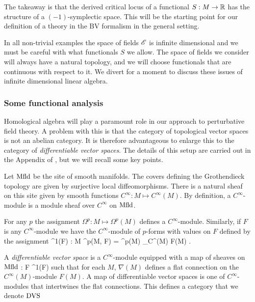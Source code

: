 The takeaway is that the derived critical locus of a functional $S : M \to \mathbb R$ has the structure of a $(-1)$-symplectic space.
This will be the starting point for our definition of a theory in the BV formalism in the general setting.
 
In all non-trivial examples the space of fields $\mathscr E$ is infinite dimensional and we must be careful with what functionals $S$ we allow.
The space of fields we consider will always have a natural topology, and we will choose functionals that are continuous with respect to it. 
We divert for a moment to discuss these issues of infinite dimensional linear algebra.

\subsubsection{Some functional analysis}
Homological algebra will play a paramount role in our approach to perturbative field theory.
A problem with this is that the category of topological vector spaces is not an abelian category.
It is therefore advantageous to enlarge this to the category of {\em differentiable vector spaces}.
The details of this setup are carried out in the Appendix of \cite{CG1}, but we will recall some key points.

Let ${\rm Mfld}$ be the site of smooth manifolds.
The covers defining the Grothendieck topology are given by surjective local diffeomorphisms.
There is a natural sheaf on this site given by smooth functions $C^\infty : M \mapsto C^\infty(M)$. 
By definition, a $C^\infty$-module is a module sheaf over $C^\infty$ on ${\rm Mfld}$. 

For any $p$ the assignment $\Omega^p : M \mapsto \Omega^p (M)$ defines a $C^\infty$-module.
Similarly, if $F$ is any $C^\infty$-module we have the $C^\infty$-module of $p$-forms with values on $F$ defined by the assignment 
\ben
\Omega^1(F) : M  \mapsto \Omega^p(M, F) = \Omega^p(M) \tensor_{C^\infty(M)} F(M) .
\een

\begin{dfn}
A {\em differentiable vector space} is a $C^\infty$-module equipped with a map of sheaves on ${\rm Mfld}$
\ben
\nabla : F \to \Omega^1(F) 
\een 
such that for each $M$, $\nabla(M)$ defines a flat connection on the $C^\infty(M)$-module $F(M)$. 
A map of differentiable vector spaces is one of $C^\infty$-modules that intertwines the flat connections. 
This defines a category that we denote ${\rm DVS}$ 
\end{dfn}

